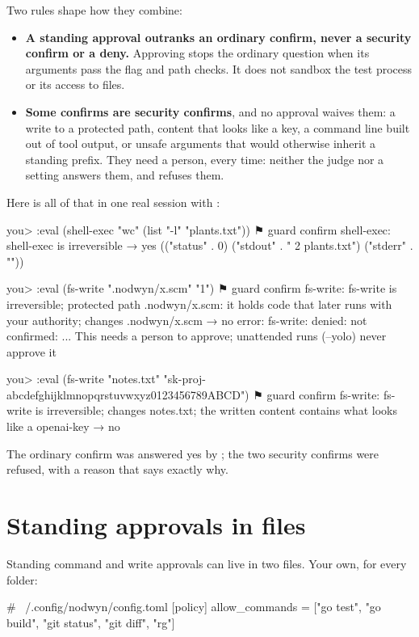 Two rules shape how they combine:

\begin{itemize}
  \item \textbf{A standing approval outranks an ordinary confirm, never a
    security confirm or a deny.} Approving  stops the ordinary
    question when its arguments pass the flag and path checks. It does not
    sandbox the test process or its access to files.
  \item \textbf{Some confirms are security confirms}, and no approval waives
    them: a write to a protected path, content that looks like a key, a
    command line built out of tool output, or unsafe arguments that would
    otherwise inherit a standing prefix. They need a person, every time:
    neither the judge nor a setting answers them, and 
    refuses them.
\end{itemize}

Here is all of that in one real session with :

\begin{txt}
you> :eval (shell-exec "wc" (list "-l" "plants.txt"))
⚑ guard confirm shell-exec: shell-exec is irreversible → yes
(("status" . 0) ("stdout" . "       2 plants.txt\n") ("stderr" . ""))

you> :eval (fs-write ".nodwyn/x.scm" "1")
⚑ guard confirm fs-write: fs-write is irreversible; protected path .nodwyn/x.scm:
  it holds code that later runs with your authority; changes .nodwyn/x.scm → no
error: fs-write: denied: not confirmed: ... This needs a person to approve;
  unattended runs (--yolo) never approve it

you> :eval (fs-write "notes.txt" "sk-proj-abcdefghijklmnopqrstuvwxyz0123456789ABCD")
⚑ guard confirm fs-write: fs-write is irreversible; changes notes.txt; the written
  content contains what looks like a openai-key → no
\end{txt}

The ordinary confirm was answered yes by ; the two security
confirms were refused, with a reason that says exactly why.

\section{Standing approvals in files}

Standing command and write approvals can live in two files. Your own,
for every folder:

\begin{toml}
# ~/.config/nodwyn/config.toml
[policy]
allow_commands = ["go test", "go build", "git status", "git diff", "rg"]
\end{toml}

